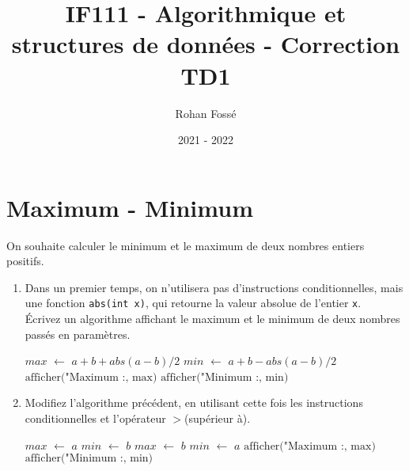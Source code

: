 \documentclass[10pt,a4paper]{article}
\title{IF111 - Algorithmique et structures de données - Correction TD1}
\date{2021 - 2022}
\author{Rohan Fossé}
\newcommand*\Let[2]{\State #1 $\gets$ #2}
\begin{document}
\maketitle

\section{Maximum - Minimum}

On souhaite calculer le minimum et le maximum de deux nombres entiers positifs. 
\begin{enumerate}
	\item Dans un premier temps, on n'utilisera pas d'instructions conditionnelles, mais une fonction \verb+abs(int x)+, qui retourne la valeur absolue de l'entier \verb+x+. \\
Écrivez un algorithme affichant le maximum et le minimum de deux nombres passés en paramètres.

\begin{tcolorbox}
  \begin{algorithmic}[1]
      \Let{$max$}{$a + b + abs(a - b)/2$}
      \Let{$min$}{$a + b - abs(a - b)/2$}
      \State $\text{afficher("Maximum :, max)}$
      \State $\text{afficher("Minimum :, min)}$
    \EndFunction
  \end{algorithmic}
\end{tcolorbox}

	
\item Modifiez l'algorithme précédent, en utilisant cette fois les instructions conditionnelles et l'opérateur $>$(supérieur à).


\begin{tcolorbox}
  \begin{algorithmic}[1]
         \Let{$max$}{$a$}
         \Let{$min$}{$b$}
      \Else
         \Let{$max$}{$b$}
         \Let{$min$}{$a$}
      \EndIf
      \State $\text{afficher("Maximum :, max)}$
      \State $\text{afficher("Minimum :, min)}$
    \EndFunction
  \end{algorithmic}
\end{tcolorbox}

\end{enumerate}
\end{document}
